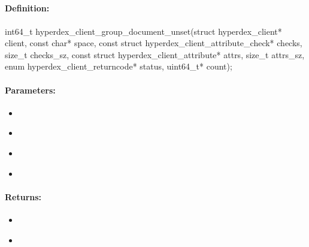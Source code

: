 \pagebreak
\subsection{}
\label{api:c:group_document_unset}


\paragraph{Definition:}
\begin{ccode}
int64_t hyperdex_client_group_document_unset(struct hyperdex_client* client,
        const char* space,
        const struct hyperdex_client_attribute_check* checks, size_t checks_sz,
        const struct hyperdex_client_attribute* attrs, size_t attrs_sz,
        enum hyperdex_client_returncode* status,
        uint64_t* count);
\end{ccode}

\paragraph{Parameters:}
\begin{itemize}[noitemsep]
\item {}\\

\item {}\\

\item {}\\

\item {}\\

\end{itemize}

\paragraph{Returns:}
\begin{itemize}[noitemsep]
\item {}\\

\item {}\\

\end{itemize}

